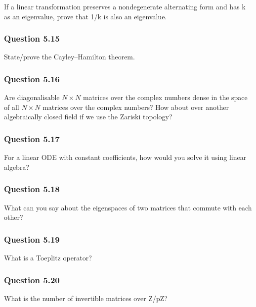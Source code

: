If a linear transformation preserves a nondegenerate alternating form
and has k as an eigenvalue, prove that 1/k is also an eigenvalue.

\hypertarget{question-5.15}{%
\subsubsection{Question 5.15}\label{question-5.15}}

State/prove the Cayley--Hamilton theorem.

\hypertarget{question-5.16}{%
\subsubsection{Question 5.16}\label{question-5.16}}

Are diagonalisable \(N \times N\) matrices over the complex numbers
dense in the space of all \(N \times N\) matrices over the complex
numbers? How about over another algebraically closed field if we use the
Zariski topology?

\hypertarget{question-5.17}{%
\subsubsection{Question 5.17}\label{question-5.17}}

For a linear ODE with constant coefficients, how would you solve it
using linear algebra?

\hypertarget{question-5.18}{%
\subsubsection{Question 5.18}\label{question-5.18}}

What can you say about the eigenspaces of two matrices that commute with
each other?

\hypertarget{question-5.19}{%
\subsubsection{Question 5.19}\label{question-5.19}}

What is a Toeplitz operator?

\hypertarget{question-5.20}{%
\subsubsection{Question 5.20}\label{question-5.20}}

What is the number of invertible matrices over Z/pZ?

